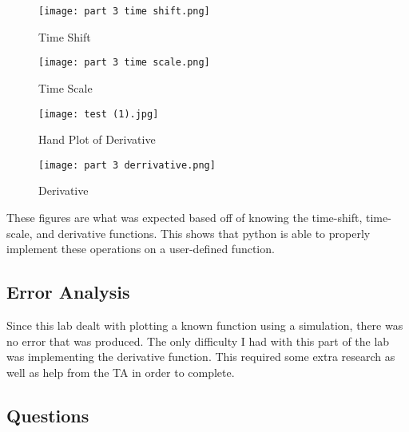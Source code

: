 \documentclass[12pt, titlepage]{article}
\begin{document}
            \begin{figure}[h!]
                \centering
                \texttt{[image: part 3 time shift.png]}
                \caption{Time Shift}
                \label{fig:my_label}
            \end{figure}
            
            \newpage
            \begin{figure}[h!]
                \centering
                \texttt{[image: part 3 time scale.png]}
                \caption{Time Scale}
                \label{fig:my_label}
            \end{figure}
            
            \begin{figure}[h!]
                \centering
                \texttt{[image: test (1).jpg]}
                \caption{Hand Plot of Derivative}
                \label{fig:my_label}
            \end{figure}
            \clearpage
            \begin{figure}[h!]
                \centering
                \texttt{[image: part 3 derrivative.png]}
                \caption{Derivative}
                \label{fig:my_label}
            \end{figure}
           
            
            These figures are what was expected based off of knowing the time-shift, time-scale, and  derivative functions.  This shows that python is able to properly implement these operations on a user-defined function.
            
            
            
            \newpage
            \subsection{Error Analysis}
            Since this lab dealt with plotting a known function using a simulation, there was no error that was produced.  The only difficulty I had with this part of the lab was implementing the derivative function.  This required some extra research as well as help from the TA in order to complete.
            
            \subsection{Questions}
            
\end{document}

